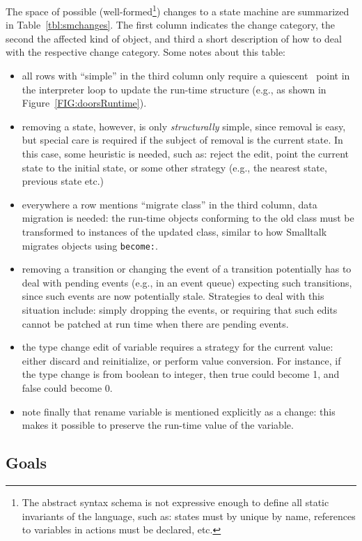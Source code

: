 \documentclass[english,submission]{programming}
\begin{document}
The space of possible (well-formed\footnote{The abstract syntax schema is not expressive enough to define all static invariants of the language, such as: states must by unique by name, references to variables in actions must be declared, etc.}) changes to a state machine are summarized in Table~\ref{tbl:smchanges}.
The first column indicates the change category, the second the affected kind of object, and third a short description of how to deal with the respective change category. Some notes about this table:
\begin{itemize}
\item all rows with ``simple'' in the third column only require a quiescent~\cite{Tranquility} point in the interpreter loop to update the run-time structure (e.g., as shown in Figure~\ref{FIG:doorsRuntime}).
\item removing a state, however, is only \textit{structurally} simple, since removal is easy, but special care is required if the subject of removal is the current state. In this case, some heuristic is needed, such as: reject the edit, point the current state to the initial state, or some other strategy (e.g., the nearest state, previous state etc.)
\item everywhere a row mentions ``migrate class'' in the third column, data migration is needed: the run-time objects conforming to the old class must be transformed to instances of the updated class, similar to how Smalltalk migrates objects using \lstinline{become:}.
\item removing a transition or changing the event of a transition potentially has to deal with pending events (e.g., in an event queue) expecting such transitions, since such events are now potentially stale. Strategies to deal with this situation include: simply dropping the events, or requiring that such edits cannot be patched at run time when there are pending events.
\item the type change edit of variable requires a strategy for the current value: either discard and reinitialize, or perform value conversion. For instance, if the type change is from boolean to integer, then true could become 1, and false could become 0.
\item note finally that rename variable is mentioned explicitly as a change: this makes it possible to preserve the run-time value of the variable.
\end{itemize}

\subsection{Goals}
\end{document}
